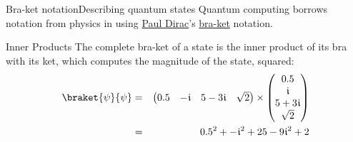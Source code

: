 \begin{frame}{Bra-ket notation}{Describing quantum states}
Quantum computing borrows notation from physics in using \href{https://en.wikipedia.org/wiki/Paul_Dirac}{Paul Dirac}'s \href{https://en.wikipedia.org/wiki/Bra-ket_notation}{bra-ket} notation.

\end{frame}

\begin{frame}{Inner Products}
The complete bra-ket of a state is the inner product of its bra with its ket, which computes the magnitude of the state, squared:
\begin{eqnarray*}
\braket{\psi}{\psi} & = &
\begin{pmatrix}
0.5 & -\NiceI & 5-3\NiceI &  \sqrt{2}
\end{pmatrix}
\times\begin{pmatrix}
0.5\\ \NiceI \\ 5+3\NiceI \\ \sqrt{2}
\end{pmatrix}
\\
 & = & 0.5^{2} + -\NiceI^{2} + 25-9\NiceI^{2} + 2 
\end{eqnarray*}
    
\end{frame}

